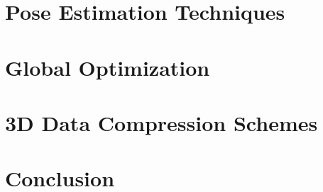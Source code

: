 \section{Pose Estimation Techniques}






\section{Global Optimization}




\section{3D Data Compression Schemes}






\section{Conclusion}

